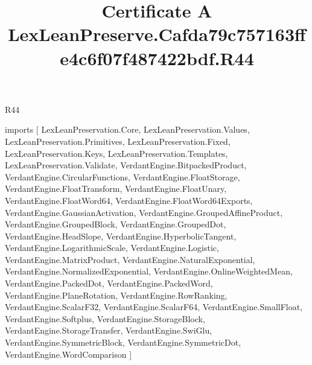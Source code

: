 \begin{lexlean}{R44}
\title{Certificate A LexLeanPreserve.Cafda79c757163ffe4c6f07f487422bdf.R44}
\begin{coremodule}
imports [
  LexLeanPreservation.Core,
  LexLeanPreservation.Values,
  LexLeanPreservation.Primitives,
  LexLeanPreservation.Fixed,
  LexLeanPreservation.Keys,
  LexLeanPreservation.Templates,
  LexLeanPreservation.Validate,
  VerdantEngine.BitpackedProduct,
  VerdantEngine.CircularFunctions,
  VerdantEngine.FloatStorage,
  VerdantEngine.FloatTransform,
  VerdantEngine.FloatUnary,
  VerdantEngine.FloatWord64,
  VerdantEngine.FloatWord64Exports,
  VerdantEngine.GaussianActivation,
  VerdantEngine.GroupedAffineProduct,
  VerdantEngine.GroupedBlock,
  VerdantEngine.GroupedDot,
  VerdantEngine.HeadSlope,
  VerdantEngine.HyperbolicTangent,
  VerdantEngine.LogarithmicScale,
  VerdantEngine.Logistic,
  VerdantEngine.MatrixProduct,
  VerdantEngine.NaturalExponential,
  VerdantEngine.NormalizedExponential,
  VerdantEngine.OnlineWeightedMean,
  VerdantEngine.PackedDot,
  VerdantEngine.PackedWord,
  VerdantEngine.PlaneRotation,
  VerdantEngine.RowRanking,
  VerdantEngine.ScalarF32,
  VerdantEngine.ScalarF64,
  VerdantEngine.SmallFloat,
  VerdantEngine.Softplus,
  VerdantEngine.StorageBlock,
  VerdantEngine.StorageTransfer,
  VerdantEngine.SwiGlu,
  VerdantEngine.SymmetricBlock,
  VerdantEngine.SymmetricDot,
  VerdantEngine.WordComparison
]


\end{coremodule}
\end{lexlean}
